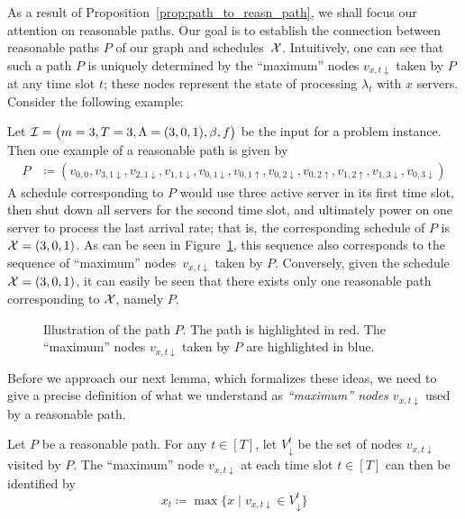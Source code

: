 As a result of Proposition~\ref{prop:path_to_reasn_path}, we shall focus our attention on reasonable paths. Our goal is to establish the connection between reasonable paths $P$ of our graph and schedules~$\mathcal{X}$. Intuitively, one can see that such a path $P$ is uniquely determined by the ``maximum'' nodes $v_{x,t\downarrow}$ taken by $P$ at any time slot $t$; these nodes represent the state of processing $\lambda_t$ with $x$ servers. Consider the following example:
\begin{exmpl}
Let $\mathcal{I}=\bigl(m=3,T=3,\Lambda=(3,0,1),\beta,f\bigr)$ be the input for a problem instance. Then one example of a reasonable path is given by
\begin{align*}
	P&\coloneqq(v_{0,0},v_{3,1\downarrow},v_{2,1\downarrow},v_{1,1\downarrow},v_{0,1\downarrow},v_{0,1\uparrow},v_{0,2\downarrow},v_{0,2\uparrow},v_{1,2\uparrow},v_{1,3\downarrow},v_{0,3\downarrow})
\end{align*}
A schedule corresponding to $P$ would use three active server in its first time slot, then shut down all servers for the second time slot, and ultimately power on one server to process the last arrival rate; that is, the corresponding schedule of $P$ is $\mathcal{X}=(3,0,1)$. As can be seen in Figure~\ref{fig:graph_pseudo_lin_example_max_nodes}, this sequence also corresponds to the sequence of ``maximum'' nodes~$v_{x,t\downarrow}$ taken by $P$. 
Conversely, given the schedule $\mathcal{X}=(3,0,1)$, it can easily be seen that there exists only one reasonable path corresponding to $\mathcal{X}$, namely $P$.
\begin{figure}[H]

\caption{Illustration of the path $P$. The path is highlighted in red. The ``maximum'' nodes $v_{x,t\downarrow}$ taken by $P$ are highlighted in blue.}
\label{fig:graph_pseudo_lin_example_max_nodes}
\end{figure}
\end{exmpl}
Before we approach our next lemma, which formalizes these ideas, we need to give a precise definition of what we understand as \emph{``maximum'' nodes $v_{x,t\downarrow}$} used by a reasonable path.
\begin{defn}\label{defn:max_path_node}
Let $P$ be a reasonable path. For any $t\in[T]$, let $V_\downarrow^t$ be the set of nodes $v_{x,t\downarrow}$ visited by $P$. The ``maximum'' node $v_{x,t\downarrow}$ at each time slot $t\in[T]$ can then be identified by
\begin{equation*}
	x_t\coloneqq\max\bigl\{x\mid v_{x,t\downarrow}\in V_\downarrow^t\bigr\}
\end{equation*}
\end{defn}
